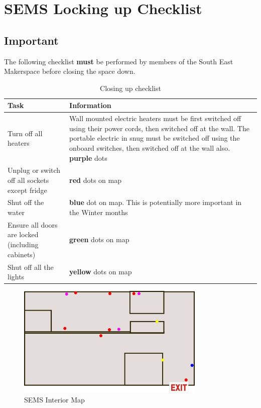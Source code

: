 \documentclass{article}
\begin{document}


\section*{SEMS Locking up Checklist}

\subsection*{Important}
The following checklist \textbf{must} be performed by members of the South East Makerspace before closing the space down.


\begin{table}[h]
	\centering
	\caption{Closing up checklist} 
	\label{tab:checklist}
	\begin{tabularx}{.9\textwidth}{XX}
		\toprule
		\textbf{Task} & \textbf{Information} \\ 
		\midrule
		Turn off all heaters & Wall mounted electric heaters must be first switched off using their power cords, then switched off at the wall. The portable electric in snug must be switched off using the onboard switches, then switched off at the wall also. \textbf{purple} dots \\ 
		Unplug or switch off all sockets except fridge & \textbf{red} dots on map \\ 
		Shut off the water & \textbf{blue} dot on map. This is potentially more important in the Winter months \\ 
		Ensure all doors are locked (including cabinets) & \textbf{green} dots on map \\ 
		Shut off all the lights & \textbf{yellow} dots on map \\ 
		\bottomrule
	\end{tabularx}
\end{table}

%
\begin{figure}[ht]
	\centering
	\includegraphics[width=9cm]{Sems}
	\caption{SEMS Interior Map}
	\label{fig:sems_map}
\end{figure}
%
\end{document}
